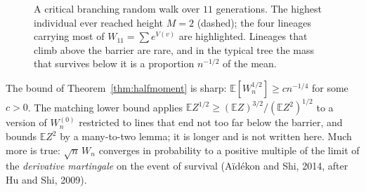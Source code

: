 \begin{figure}[ht]\centering{}
\caption{A critical branching random walk over $11$ generations. The highest individual ever reached height $M=2$ (dashed); the four lineages carrying most of $W_{11}=\sum e^{V(v)}$ are highlighted. Lineages that climb above the barrier are rare, and in the typical tree the mass that survives below it is a proportion $n^{-1/2}$ of the mean.}\label{fig:barrier}
\end{figure}

\begin{remark}\label{rem:brwlower}
The bound of Theorem~\ref{thm:halfmoment} is sharp: $\mathbb E[W_n^{1/2}]\ge cn^{-1/4}$ for some $c>0$. The matching lower bound applies $\mathbb EZ^{1/2}\ge(\mathbb EZ)^{3/2}/(\mathbb EZ^2)^{1/2}$ to a version of $W_n^{(0)}$ restricted to lines that end not too far below the barrier, and bounds $\mathbb EZ^2$ by a many-to-two lemma; it is longer and is not written here. Much more is true: $\sqrt n\,W_n$ converges in probability to a positive multiple of the limit of the \emph{derivative martingale} on the event of survival (Aïdékon and Shi, 2014, after Hu and Shi, 2009).
\end{remark}
